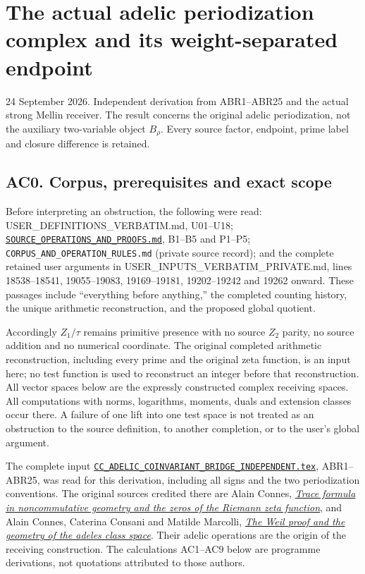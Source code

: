 \section{The actual adelic periodization complex and its
weight-separated
endpoint}\label{the-actual-adelic-periodization-complex-and-its-weight-separated-endpoint}

24 September 2026. Independent derivation from ABR1--ABR25 and the
actual strong Mellin receiver. The result concerns the original adelic
periodization, not the auxiliary two-variable object \(B_\rho\). Every
source factor, endpoint, prime label and closure difference is retained.

\subsection{AC0. Corpus, prerequisites and exact
scope}\label{ac0.-corpus-prerequisites-and-exact-scope}

Before interpreting an obstruction, the following were read:
{USER\_DEFINITIONS\_VERBATIM.md},
U01--U18;
\href{../foundations/user_definitions_20260924/SOURCE_OPERATIONS_AND_PROOFS.md}{\nolinkurl{SOURCE_OPERATIONS_AND_PROOFS.md}},
B1--B5 and P1--P5; \nolinkurl{CORPUS_AND_OPERATION_RULES.md} (private source record); and the complete
retained user arguments in
{USER\_INPUTS\_VERBATIM\_PRIVATE.md},
lines 18538--18541, 19055--19083, 19169--19181, 19202--19242 and 19262
onward. These passages include ``everything before anything,'' the
completed counting history, the unique arithmetic reconstruction, and
the proposed global quotient.

Accordingly \(Z_1/\tau\) remains primitive presence with no source
\(Z_2\) parity, no source addition and no numerical coordinate. The
original completed arithmetic reconstruction, including every prime and
the original zeta function, is an input here; no test function is used
to reconstruct an integer before that reconstruction. All vector spaces
below are the expressly constructed complex receiving spaces. All
computations with norms, logarithms, moments, duals and extension
classes occur there. A failure of one lift into one test space is not
treated as an obstruction to the source definition, to another
completion, or to the user's global argument.

The complete input
\href{../independent/CC_ADELIC_COINVARIANT_BRIDGE_INDEPENDENT.tex}{\nolinkurl{CC_ADELIC_COINVARIANT_BRIDGE_INDEPENDENT.tex}},
ABR1--ABR25, was read for this derivation, including all signs and the
two periodization conventions. The original sources credited there are
Alain Connes, \href{https://arxiv.org/abs/math/9811068}{\emph{Trace
formula in noncommutative geometry and the zeros of the Riemann zeta
function}}, and Alain Connes, Caterina Consani and Matilde Marcolli,
\href{https://arxiv.org/abs/math/0703392}{\emph{The Weil proof and the
geometry of the adeles class space}}. Their adelic operations are the
origin of the receiving construction. The calculations AC1--AC9 below
are programme derivations, not quotations attributed to those authors.


